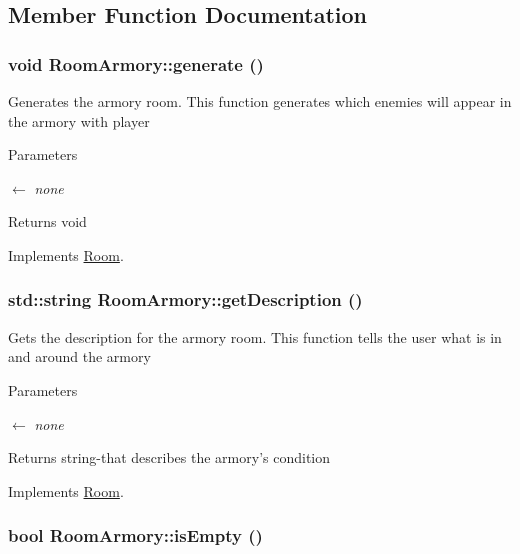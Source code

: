 \subsection{Member Function Documentation}
\hypertarget{classRoomArmory_a7b8a849994b2e71b1762420f08b5dcf2}{
\subsubsection[{generate}]{\setlength{\rightskip}{0pt plus 5cm}void RoomArmory::generate ()}}
\label{classRoomArmory_a7b8a849994b2e71b1762420f08b5dcf2}


Generates the armory room. This function generates which enemies will appear in the armory with player 
\begin{DoxyParams}{Parameters}
\item[\mbox{$\leftarrow$} {\em none}]\end{DoxyParams}
\begin{DoxyReturn}{Returns}
void 
\end{DoxyReturn}


Implements \hyperlink{classRoom_a3556128b8e7f544fa618576fbab4b52e}{Room}.\hypertarget{classRoomArmory_af4199a79cd8e191eb01feb93b19e5a4e}{
\subsubsection[{getDescription}]{\setlength{\rightskip}{0pt plus 5cm}std::string RoomArmory::getDescription ()}}
\label{classRoomArmory_af4199a79cd8e191eb01feb93b19e5a4e}


Gets the description for the armory room. This function tells the user what is in and around the armory 
\begin{DoxyParams}{Parameters}
\item[\mbox{$\leftarrow$} {\em none}]\end{DoxyParams}
\begin{DoxyReturn}{Returns}
string-\/that describes the armory's condition 
\end{DoxyReturn}


Implements \hyperlink{classRoom_aacf839325fa7c6b08d21533b0780025c}{Room}.\hypertarget{classRoomArmory_a88517bf2ee701232041c415684649c91}{
\subsubsection[{isEmpty}]{\setlength{\rightskip}{0pt plus 5cm}bool RoomArmory::isEmpty ()}}
\label{classRoomArmory_a88517bf2ee701232041c415684649c91}


